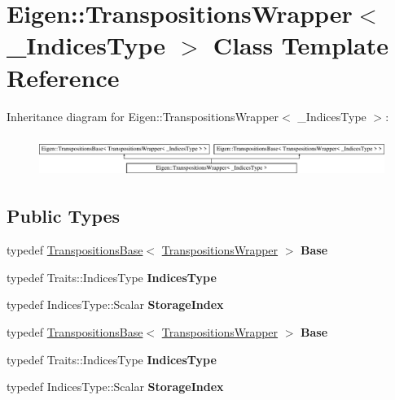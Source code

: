 \hypertarget{class_eigen_1_1_transpositions_wrapper}{}\section{Eigen\+:\+:Transpositions\+Wrapper$<$ \+\_\+\+Indices\+Type $>$ Class Template Reference}
\label{class_eigen_1_1_transpositions_wrapper}
Inheritance diagram for Eigen\+:\+:Transpositions\+Wrapper$<$ \+\_\+\+Indices\+Type $>$\+:\begin{figure}[H]
\begin{center}
\leavevmode
\includegraphics[height=1.333333cm]{class_eigen_1_1_transpositions_wrapper}
\end{center}
\end{figure}
\subsection*{Public Types}
\begin{DoxyCompactItemize}
\item 
\mbox{\label{class_eigen_1_1_transpositions_wrapper_a94ed84038f4e22d54262b354f112fa76}} 
typedef \hyperlink{class_eigen_1_1_transpositions_base}{Transpositions\+Base}$<$ \hyperlink{class_eigen_1_1_transpositions_wrapper}{Transpositions\+Wrapper} $>$ {\bfseries Base}
\item 
\mbox{\label{class_eigen_1_1_transpositions_wrapper_ad928b75abe38ccb534d78276db4134db}} 
typedef Traits\+::\+Indices\+Type {\bfseries Indices\+Type}
\item 
\mbox{\label{class_eigen_1_1_transpositions_wrapper_ac57efa0257d22082939d17fd0d2aaf95}} 
typedef Indices\+Type\+::\+Scalar {\bfseries Storage\+Index}
\item 
\mbox{\label{class_eigen_1_1_transpositions_wrapper_a94ed84038f4e22d54262b354f112fa76}} 
typedef \hyperlink{class_eigen_1_1_transpositions_base}{Transpositions\+Base}$<$ \hyperlink{class_eigen_1_1_transpositions_wrapper}{Transpositions\+Wrapper} $>$ {\bfseries Base}
\item 
\mbox{\label{class_eigen_1_1_transpositions_wrapper_ad928b75abe38ccb534d78276db4134db}} 
typedef Traits\+::\+Indices\+Type {\bfseries Indices\+Type}
\item 
\mbox{\label{class_eigen_1_1_transpositions_wrapper_ac57efa0257d22082939d17fd0d2aaf95}} 
typedef Indices\+Type\+::\+Scalar {\bfseries Storage\+Index}
\end{DoxyCompactItemize}
